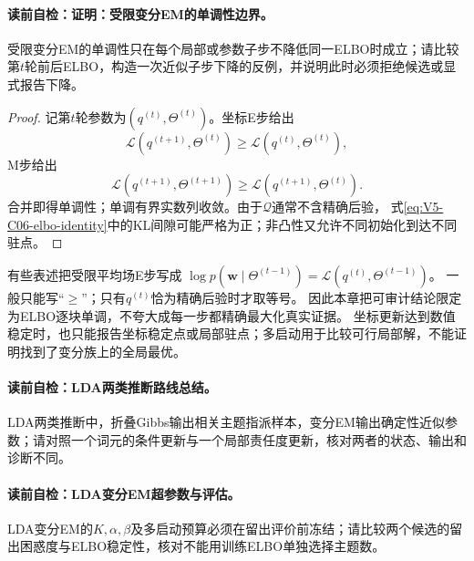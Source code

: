 \paragraph{读前自检：证明：受限变分EM的单调性边界。}受限变分EM的单调性只在每个局部或参数子步不降低同一ELBO时成立；请比较第$t$轮前后ELBO，构造一次近似子步下降的反例，并说明此时必须拒绝候选或显式报告下降。\par

\begin{proof}
记第$t$轮参数为$(q^{(t)},\Theta^{(t)})$。坐标E步给出
\[
\mathcal L(q^{(t+1)},\Theta^{(t)})
\ge\mathcal L(q^{(t)},\Theta^{(t)}),
\]
M步给出
\[
\mathcal L(q^{(t+1)},\Theta^{(t+1)})
\ge\mathcal L(q^{(t+1)},\Theta^{(t)}).
\]
合并即得单调性；单调有界实数列收敛。由于$\mathcal Q$通常不含精确后验，
式\eqref{eq:V5-C06-elbo-identity}中的KL间隙可能严格为正；非凸性又允许不同初始化到达不同驻点。
\end{proof}

\begin{limitationbox}
有些表述把受限平均场E步写成
$\log p(\boldsymbol w\mid\Theta^{(t-1)})
=\mathcal L(q^{(t)},\Theta^{(t-1)})$。
一般只能写“$\ge$”；只有$q^{(t)}$恰为精确后验时才取等号。
因此本章把可审计结论限定为ELBO逐块单调，不夸大成每一步都精确最大化真实证据。
坐标更新达到数值稳定时，也只能报告坐标稳定点或局部驻点；多启动用于比较可行局部解，不能证明找到了变分族上的全局最优。
\end{limitationbox}


\paragraph{读前自检：LDA两类推断路线总结。}LDA两类推断中，折叠Gibbs输出相关主题指派样本，变分EM输出确定性近似参数；请对照一个词元的条件更新与一个局部责任度更新，核对两者的状态、输出和诊断不同。\par
\paragraph{读前自检：LDA变分EM超参数与评估。}LDA变分EM的$K,\alpha,\beta$及多启动预算必须在留出评价前冻结；请比较两个候选的留出困惑度与ELBO稳定性，核对不能用训练ELBO单独选择主题数。\par



